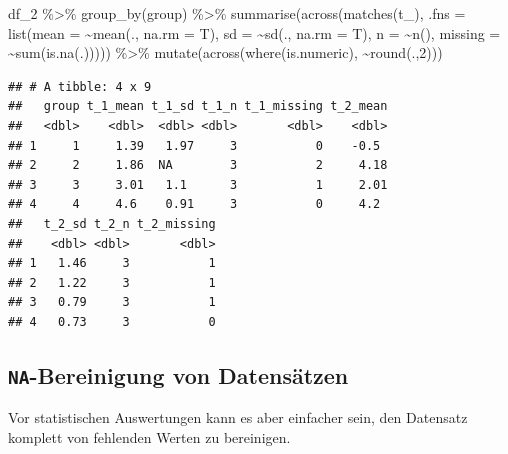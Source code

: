 \documentclass[
]{book}
\newenvironment{Shaded}{\begin{snugshade}}{\end{snugshade}}
\newcommand{\AttributeTok}[1]{\textcolor[rgb]{0.77,0.63,0.00}{#1}}
\newcommand{\DecValTok}[1]{\textcolor[rgb]{0.00,0.00,0.81}{#1}}
\newcommand{\FunctionTok}[1]{\textcolor[rgb]{0.00,0.00,0.00}{#1}}
\newcommand{\NormalTok}[1]{#1}
\newcommand{\SpecialCharTok}[1]{\textcolor[rgb]{0.00,0.00,0.00}{#1}}
\newcommand{\StringTok}[1]{\textcolor[rgb]{0.31,0.60,0.02}{#1}}
\begin{document}
\begin{Shaded}
\begin{Highlighting}[]
\NormalTok{df\_2 }\SpecialCharTok{\%\textgreater{}\%} 
  \FunctionTok{group\_by}\NormalTok{(group) }\SpecialCharTok{\%\textgreater{}\%} 
  \FunctionTok{summarise}\NormalTok{(}\FunctionTok{across}\NormalTok{(}\FunctionTok{matches}\NormalTok{(}\StringTok{\textquotesingle{}t\_\textquotesingle{}}\NormalTok{),}
                   \AttributeTok{.fns =} \FunctionTok{list}\NormalTok{(}\AttributeTok{mean =} \SpecialCharTok{\textasciitilde{}}\FunctionTok{mean}\NormalTok{(., }\AttributeTok{na.rm =}\NormalTok{ T),}
                               \AttributeTok{sd =} \SpecialCharTok{\textasciitilde{}}\FunctionTok{sd}\NormalTok{(., }\AttributeTok{na.rm =}\NormalTok{ T),}
                               \AttributeTok{n =} \SpecialCharTok{\textasciitilde{}}\FunctionTok{n}\NormalTok{(),}
                               \AttributeTok{missing =} \SpecialCharTok{\textasciitilde{}}\FunctionTok{sum}\NormalTok{(}\FunctionTok{is.na}\NormalTok{(.))))) }\SpecialCharTok{\%\textgreater{}\%} 
  \FunctionTok{mutate}\NormalTok{(}\FunctionTok{across}\NormalTok{(}\FunctionTok{where}\NormalTok{(is.numeric),}
                \SpecialCharTok{\textasciitilde{}}\FunctionTok{round}\NormalTok{(.,}\DecValTok{2}\NormalTok{)))}
\end{Highlighting}
\end{Shaded}

\begin{verbatim}
## # A tibble: 4 x 9
##   group t_1_mean t_1_sd t_1_n t_1_missing t_2_mean
##   <dbl>    <dbl>  <dbl> <dbl>       <dbl>    <dbl>
## 1     1     1.39   1.97     3           0    -0.5 
## 2     2     1.86  NA        3           2     4.18
## 3     3     3.01   1.1      3           1     2.01
## 4     4     4.6    0.91     3           0     4.2 
##   t_2_sd t_2_n t_2_missing
##    <dbl> <dbl>       <dbl>
## 1   1.46     3           1
## 2   1.22     3           1
## 3   0.79     3           1
## 4   0.73     3           0
\end{verbatim}

\hypertarget{na-bereinigung-von-datensuxe4tzen}{%
\subsection{\texorpdfstring{\texttt{NA}-Bereinigung von Datensätzen}{NA-Bereinigung von Datensätzen}}\label{na-bereinigung-von-datensuxe4tzen}}

Vor statistischen Auswertungen kann es aber einfacher sein, den Datensatz komplett von fehlenden Werten zu bereinigen.
\end{document}
